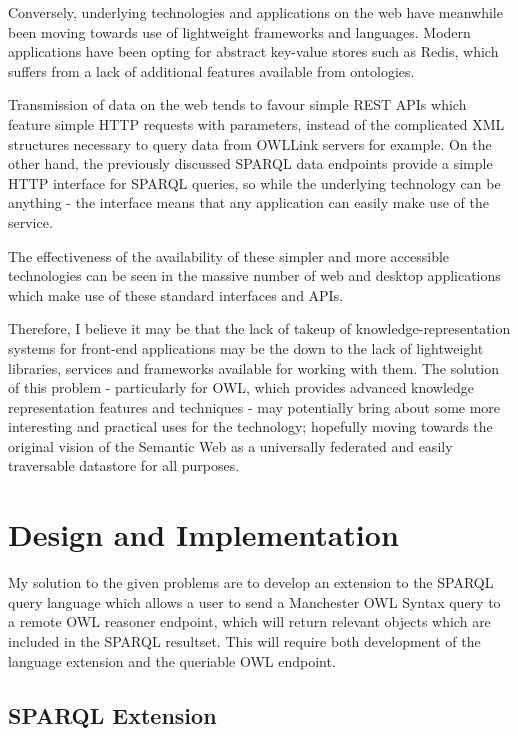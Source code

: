 \documentclass{article}
\begin{document}
Conversely, underlying technologies and applications on the web have meanwhile 
been moving towards use of lightweight frameworks and languages. Modern applications 
have been opting for abstract key-value stores such as Redis, which suffers from
a lack of additional features available from ontologies. 

Transmission of data on the web tends to favour simple REST APIs which feature 
simple HTTP requests with parameters, instead of the complicated XML structures 
necessary to query data from OWLLink servers for example. On the other hand, the
previously discussed SPARQL data endpoints provide a simple HTTP interface for
SPARQL queries, so while the underlying technology can be anything - the
interface means that any application can easily make use of the service.

The effectiveness of the availability of these simpler and more accessible 
technologies can be seen in the massive number of web and desktop applications
which make use of these standard interfaces and APIs.

Therefore, I believe it may be that the lack of takeup of knowledge-representation systems
for front-end applications may be the down to the lack of lightweight libraries, 
services and frameworks available for working with them. The solution of this
problem - particularly for OWL, which provides advanced knowledge representation
features and techniques - may potentially bring about some more interesting and
practical uses for the technology; hopefully moving towards the original vision
of the Semantic Web as a universally federated and easily traversable datastore
for all purposes.

\section{Design and Implementation}

My solution to the given problems are to develop an extension to the SPARQL
query language which allows a user to send a Manchester OWL Syntax query to a
remote OWL reasoner endpoint, which will return relevant objects which are
included in the SPARQL resultset. This will require both development of the
language extension and the queriable OWL endpoint.

\subsection{SPARQL Extension}
\end{document}
